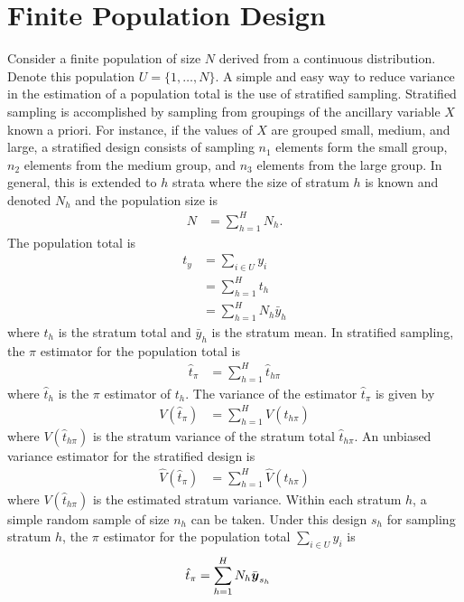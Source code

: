 \documentclass[fleqn]{article}
\def\bm#1{\mbox{\boldmath $#1$}}
\begin{document}
\section{Finite Population Design}
  Consider a finite population of size $N$ derived from a continuous distribution. Denote this population $U = \{1, \ldots, N\}$. A simple and easy way to reduce variance in the estimation of a population total is the use of stratified sampling. Stratified sampling is accomplished by sampling from groupings of the ancillary variable $X$ known a priori. For instance, if the values of $X$ are grouped small, medium, and large, a stratified design consists of sampling $n_1$ elements form the small group, $n_2$ elements from the medium group, and $n_3$ elements from the large group. In general, this is extended to $h$ strata where the size of stratum $h$ is known and denoted $N_h$ and the population size is 
  \begin{align*}
    N & = \sum_{h = 1}^H N_h. 
  \end{align*}
The population total is
  \begin{align*}
    t_y & = \sum_{i \in U} y_i\\
    & = \sum_{h = 1}^H t_h\\
    & =\sum_{h = 1}^H N_h \bar{y}_h
  \end{align*}
where $t_h$ is the stratum total and $\bar{y}_h$ is the stratum mean. In stratified sampling, the $\pi$ estimator for the population total is 
  \begin{align*}
    \hat{t}_\pi & = \sum_{h = 1}^H \hat{t}_{h \pi}
  \end{align*}
where $\hat{t}_h$ is the $\pi$ estimator of $t_h$. The variance of the estimator $\hat{t}_\pi$ is given by
  \begin{align*}
    V(\hat{t}_\pi) & = \sum_{h = 1}^H V(\hat{t}_{h \pi})
  \end{align*}
where $V(\hat{t}_{h \pi})$ is the stratum variance of the stratum total $\hat{t}_{h \pi}$. An unbiased variance estimator for the stratified design is 
  \begin{align*}
    \hat{V}(\hat{t}_\pi) & = \sum_{h = 1}^H \hat{V}(\hat{t}_{h \pi})
  \end{align*}
where $V(\hat{t}_{h \pi})$ is the estimated stratum variance. Within each stratum $h$, a simple random sample of size $n_h$ can be taken. Under this design $s_h$ for sampling stratum $h$, the $\pi$ estimator for the population total $\sum_{i \in U} y_i$ is 
  \begin{align*}
    \hat{t}_{\pi} & = \sum_{h = 1}^H N_h \bar{\bm{y}}_{s_h}
  \end{align*}
\end{document}
